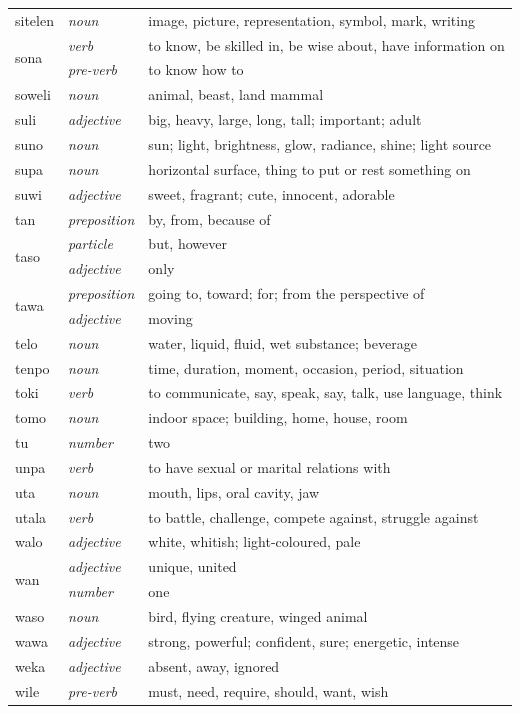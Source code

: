 \documentclass[14pt, a4paper]{extreport}
\begin{document}
\begin{longtable}{llp{10cm}}
  sitelen & \textit{noun} & image, picture, representation, symbol, mark, writing \\
  \multirow[t]{2}{*}{sona} & \textit{verb} & to know, be skilled in, be wise about, have information on \\
  & \textit{pre-verb} & to know how to \\
  soweli & \textit{noun} & animal, beast, land mammal \\
  suli & \textit{adjective} & big, heavy, large, long, tall; important; adult \\
  suno & \textit{noun} & sun; light, brightness, glow, radiance, shine; light source \\
  supa & \textit{noun} & horizontal surface, thing to put or rest something on \\
  suwi & \textit{adjective} & sweet, fragrant; cute, innocent, adorable \\
  tan & \textit{preposition} & by, from, because of \\
  \multirow[t]{2}{*}{taso} & \textit{particle} & but, however \\
  & \textit{adjective} & only \\
  \multirow[t]{2}{*}{tawa} & \textit{preposition} & going to, toward; for; from the perspective of \\
  & \textit{adjective} & moving \\
  telo & \textit{noun} & water, liquid, fluid, wet substance; beverage \\
  tenpo & \textit{noun} & time, duration, moment, occasion, period, situation \\
  toki & \textit{verb} & to communicate, say, speak, say, talk, use language, think \\
  tomo & \textit{noun} & indoor space; building, home, house, room \\
  tu & \textit{number} & two \\
  unpa & \textit{verb} & to have sexual or marital relations with \\
  uta & \textit{noun} & mouth, lips, oral cavity, jaw \\
  utala & \textit{verb} & to battle, challenge, compete against, struggle against \\
  walo & \textit{adjective} & white, whitish; light-coloured, pale \\
  \multirow[t]{2}{*}{wan} & \textit{adjective} & unique, united \\
  & \textit{number} & one \\
  waso & \textit{noun} & bird, flying creature, winged animal \\
  wawa & \textit{adjective} & strong, powerful; confident, sure; energetic, intense \\
  weka & \textit{adjective} & absent, away, ignored \\
  wile & \textit{pre-verb} & must, need, require, should, want, wish \\
\end{longtable}
\end{document}
